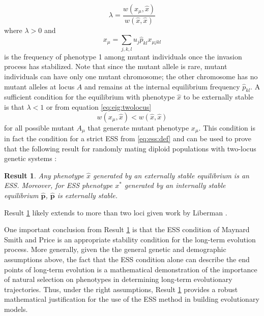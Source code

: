\documentclass[11pt]{article}
\newcommand{\ess}[1]{#1^*}
\newcommand{\fixp}[1]{\hat{#1}}
\renewcommand{\vec}[1]{\symbf{#1}}
\newcommand{\mut}{\mu}
\newcommand{\eig}{\lambda}
\newtheorem{result}{Result}
\begin{document}
\begin{equation}
  \label{eq:eig:twolocus}
  \eig = \frac{w(x_{\mut}, \fixp{x})}{w(\fixp{x}, \fixp{x})}
\end{equation}
where $\eig>0$ and
\begin{equation}
  \label{eq:mut:pheno:twolocus}
  x_{\mut} = \sum_{j,k,l} u_{j} \fixp{p}_{kl} x_{\mut jkl}
\end{equation}
is the frequency of phenotype 1 among mutant individuals once the invasion process has stabilized. Note that since the mutant allele is rare, mutant individuals can have only one mutant chromosome; the other chromosome has no mutant alleles at locus $A$ and remains at the internal equilibrium frequency $\fixp{p}_{kl}$. A sufficient condition for the equilibrium with phenotype $\fixp{x}$ to be externally stable is that $\eig < 1$ or from equation \eqref{eq:eig:twolocus}
\begin{equation*}
  w(x_{\mut}, \fixp{x}) < w(\fixp{x}, \fixp{x})
\end{equation*}
for all possible mutant $A_{\mut}$ that generate mutant phenotype $x_{\mut}$. This condition is in fact the condition for a strict ESS from \eqref{eq:ess:def} and can be used to prove that the following result for randomly mating diploid populations with two-locus genetic systems \cite{Eshel:Feldman:1984,Eshel:1996,Eshel:Feldman:1998}:
\begin{result}
  \label{res:twolocus}
  Any phenotype $\fixp{x}$ generated by an externally stable equilibrium is an ESS. Moreover, for ESS phenotype $\ess{x}$ generated by an internally stable equilibrium $\fixp{\vec{p}}$, $\fixp{\vec{p}}$ is externally stable.
\end{result}
\noindent
Result \ref{res:twolocus} likely extends to more than two loci given work by Liberman \cite{Liberman:1988}.

One important conclusion from Result \ref{res:twolocus} is that the ESS condition of Maynard Smith and Price \cite{Maynard-Smith:Price:1973,Maynard-Smith:1974} is an appropriate stability condition for the long-term evolution process. More generally, given the the general genetic and demographic assumptions above, the fact that the ESS condition alone can describe the end points of long-term evolution is a mathematical demonstration of the importance of natural selection on phenotypes in determining long-term evolutionary trajectories. Thus, under the right assumptions, Result \ref{res:twolocus} provides a robust mathematical justification for the use of the ESS method in building evolutionary models.
\end{document}
